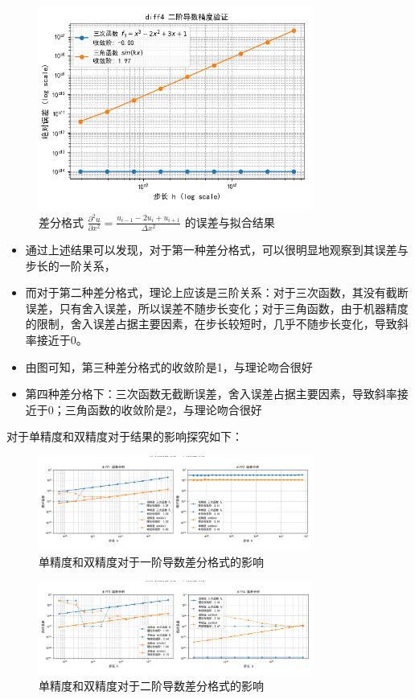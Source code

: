\documentclass[UTF8]{ctexart}
\begin{document}
\begin{figure}[H]
    \centering
    \includegraphics[width=0.8\textwidth]{f4.png} 
    \caption{差分格式 $\frac{\partial^2 u}{\partial x^2} = \frac{u_{i-1} - 2u_i + u_{i+1}}{\Delta x^2}$  的误差与拟合结果}
    \label{fig:result4} 
\end{figure}

\begin{itemize}
    \item 通过上述结果可以发现，对于第一种差分格式，可以很明显地观察到其误差与步长的一阶关系，
    \item 而对于第二种差分格式，理论上应该是三阶关系：对于三次函数，其没有截断误差，只有舍入误差，所以误差不随步长变化；对于三角函数，由于机器精度的限制，舍入误差占据主要因素，在步长较短时，几乎不随步长变化，导致斜率接近于0。
    \item 由图可知，第三种差分格式的收敛阶是1，与理论吻合很好
    \item 第四种差分格下：三次函数无截断误差，舍入误差占据主要因素，导致斜率接近于0；三角函数的收敛阶是2，与理论吻合很好
\end{itemize}

对于单精度和双精度对于结果的影响探究如下：
\begin{figure}[H]
    \centering
    \includegraphics[width=0.8\textwidth]{Figure_3.png} 
    \caption{单精度和双精度对于一阶导数差分格式的影响}
\end{figure}
\begin{figure}[H]
    \centering
    \includegraphics[width=0.8\textwidth]{Figure_4.png} 
    \caption{单精度和双精度对于二阶导数差分格式的影响}
\end{figure}
\end{document}
